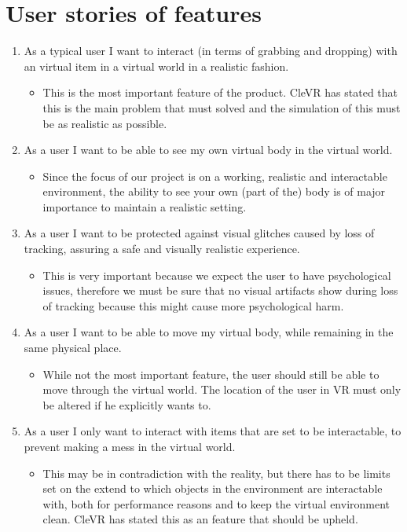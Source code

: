 \documentclass[11pt,a4paper]{report}
\begin{document}
\section{User stories of features}
\begin{enumerate}
\item As a typical user I want to interact (in terms of grabbing and dropping) with an virtual item in a virtual world in a realistic fashion.
\begin{itemize}
\item This is the most important feature of the product. CleVR has stated that this is the main problem that must solved and the simulation of this must be as realistic as possible. 
\end{itemize}
\item As a user I want to be able to see my own virtual body in the virtual world.
\begin{itemize}
\item Since the focus of our project is on a working, realistic and interactable environment, the ability to see your own (part of the) body is of major importance to maintain a realistic setting.
\end{itemize}
\item As a user I want to be protected against visual glitches caused by loss of tracking, assuring a safe and visually realistic experience. 
\begin{itemize}
\item This is very important because we expect the user to have psychological issues, therefore we must be sure that no visual artifacts show during loss of tracking because this might cause more psychological harm. 
\end{itemize}
\item As a user I want to be able to move my virtual body, while remaining in the same physical place.
\begin{itemize}
\item While not the most important feature, the user should still be able to move through the virtual world. The location of the user in VR must only be altered if he explicitly wants to.
\end{itemize}
\item As a user I only want to interact with items that are set to be interactable, to prevent making a mess in the virtual world.
\begin{itemize}
\item This may be in contradiction with the reality, but there has to be limits set on the extend to which objects in the environment are interactable with, both for performance reasons and to keep the virtual environment clean. CleVR has stated this as an feature that should be upheld.

\end{itemize}
\end{enumerate}
\end{document}
